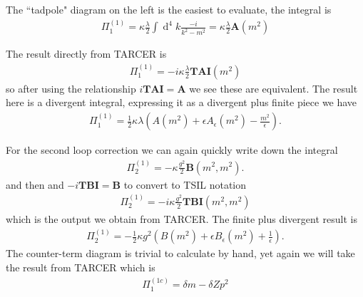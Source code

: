 \documentclass[11pt]{article}
\renewcommand{\d}{\ensuremath{\operatorname{d}\!}}
\newcommand{\tsil}{\textsf{TSIL} \! }
\newcommand{\tarcer}{\textsf{TARCER} \! }
\begin{document}
\noindent\begin{minipage}{0.7\textwidth}
The ``tadpole" diagram on the left is the easiest to evaluate, the integral is
\begin{align}
\Pi^{(1)}_1 =  \kappa\frac{\lambda}{2} \int \d^4k \frac{-i}{k^2-m^2} =  \kappa \frac{\lambda}{2} \mathbf{A}(m^2)
\end{align}

The result directly from TARCER is
\begin{align}
\Pi^{(1)}_1 = -i \kappa \frac{\lambda}{2} \mathbf{TAI}(m^2)
\end{align}
so after using the relationship $i\mathbf{TAI} = \mathbf{A}$ we see these are equivalent.  The result here is a divergent integral, expressing it as a divergent plus finite piece we have
\begin{align}
\Pi^{(1)}_1 = \frac{1}{2}\kappa\lambda\left(A(m^2)+\epsilon A_{\epsilon}(m^2)-\frac{m^2}{\epsilon}\right).\label{eqn:scalar_1}
\end{align}

\end{minipage}

For the second loop correction we can again quickly write down the integral
\begin{align}
\Pi^{(1)}_2 = -\kappa \frac{g^2}{2} \mathbf{B}(m^2,m^2).
\end{align}
 and then  and $-i\mathbf{TBI} = \mathbf{B}$ to convert to \tsil notation
\begin{align}
\Pi^{(1)}_2 =-i \kappa \frac{g^2}{2} \mathbf{TBI}(m^2,m^2)
\end{align}
which is the output we obtain from TARCER.  The finite plus divergent result is
\begin{align}
\Pi^{(1)}_2 = - \frac{1}{2}\kappa g^2\left(B(m^2)+\epsilon B_{\epsilon}(m^2)+\frac{1}{\epsilon}\right).\label{eqn:scalar_2}
\end{align}
The counter-term diagram is trivial to calculate by hand, yet again we will take the result from \tarcer which is
\begin{align}
\Pi^{(1c)}_1 =  \delta m - \delta Z p^2
\end{align}
\end{document}
